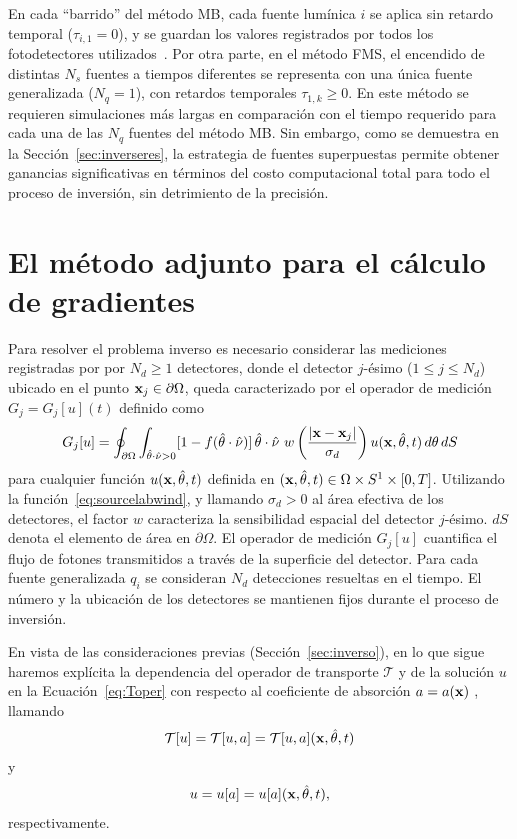  En cada ``barrido''
del método MB, cada fuente lumínica $i$ se aplica sin retardo temporal ($\tau_{i,1}=0$), y se guardan los valores registrados por todos los fotodetectores utilizados~\cite{Prieto2017,Dorn}. Por otra parte, en el método FMS, 
el encendido de distintas $N_s$ fuentes a tiempos diferentes 
se representa con una única fuente generalizada ($N_q=1$), 
con retardos temporales $\tau_{1,k}\geq 0$.
 En este método se requieren simulaciones más largas en comparación con el tiempo requerido  
para cada una de las $N_q$ fuentes del método MB. Sin embargo, como se 
demuestra en la Sección~\ref{sec:inverseres}, la estrategia de fuentes superpuestas 
permite obtener ganancias significativas en términos del costo computacional 
total para todo el proceso de inversión, sin detrimiento de la precisión. 

\section{El método adjunto para el cálculo de gradientes}
Para resolver el problema inverso es necesario considerar 
las mediciones registradas por por $N_d\geq 1$ detectores, 
donde el detector $j$-ésimo ($1\leq j\leq N_d$) ubicado en el punto 
$\mathbf{x}_j \in \partial \Omega$, queda caracterizado por el operador 
de medición $G_j=G_j[u](t)$ definido como 
\begin{equation}
  G_j[u]=\oint_{\partial \Omega}\int_{\hat{\theta} \cdot \hat{\nu}>0}[1-f(\hat{\theta}
  \cdot \hat{\nu})]
  \,\hat{\theta} \cdot \hat{\nu} \, \, w\left( \frac{ |\mathbf{x}-\mathbf{x}_j |}{\sigma_d} \right) u(\mathbf{x},\hat{\theta},t) \,
  d\theta \, dS
\label{eq:OpMed}
\end{equation}
para cualquier función $u(\mathbf{x},\hat{\theta},t)$ definida en $(\mathbf{x},\hat{\theta},t)\in\Omega\times S^1 \times [0,T] $. 
Utilizando la función~\eqref{eq:sourcelabwind}, y llamando $\sigma_d>0$ 
al área efectiva de los detectores, el factor $w$ 
caracteriza la sensibilidad espacial del detector $j$-ésimo. $dS$ denota el elemento de área en $\partial \Omega$. 
El operador de medición $G_j[u]$ cuantifica el flujo de fotones 
transmitidos a través de la superficie del detector. Para cada 
fuente generalizada $q_i$ se consideran $N_d$ detecciones 
resueltas en el tiempo. El número y la ubicación de los detectores se mantienen fijos durante el proceso de inversión. 

En vista de las consideraciones previas (Sección~\ref{sec:inverso}), 
en lo que sigue haremos explícita la dependencia del operador de transporte 
$\mathcal{T}$ y de la solución $u$ en la Ecuación~\eqref{eq:Toper} 
con respecto al coeficiente de absorción $a=a(\mathbf{x})$ , llamando 
\begin{equation}\label{eq:Toper_a}
  \mathcal{T}[u] = \mathcal{T}[u,a]= \mathcal{T}[u,a](\mathbf{x},\hat{\theta},t)
\end{equation}
y
\begin{equation}\label{u_of_a}
  u=u[a]=u[a](\mathbf{x},\hat{\theta},t),
\end{equation}
respectivamente.

